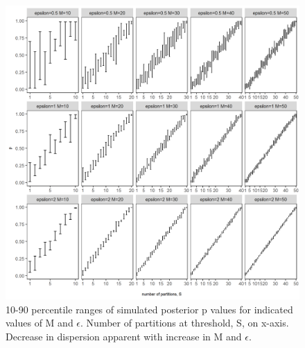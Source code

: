 \documentclass[10pt, letterpaper]{article}
\begin{document}
\begin{spacing}{1.0}
\begin{figure}[h!]
    \centering
    \includegraphics[width=6in]{RacePayDifferential-p-Simulation-10-90-Quantiles.png}
    \caption{10-90 percentile ranges of simulated posterior p values for indicated values of M and $\epsilon$.  Number of partitions at threshold, S, on x-axis.  Decrease in dispersion apparent with increase in M and $\epsilon$.}
    \label{figure:RacePayDifferential-p-Simulation-10-90-Quantiles}
\end{figure}

\clearpage

\end{spacing}
  
\end{document}
